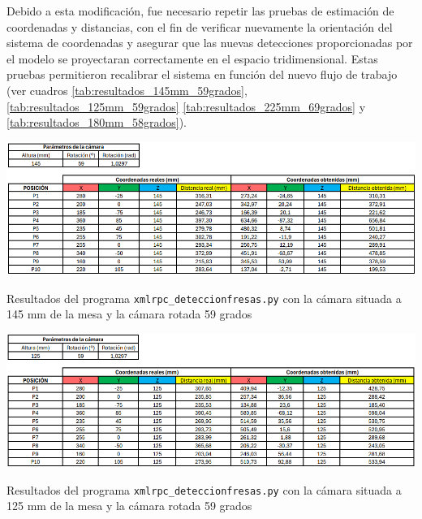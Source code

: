 \pagebreak
Debido a esta modificación, fue necesario repetir las pruebas de estimación de coordenadas y distancias, con el fin de verificar nuevamente la orientación del sistema de coordenadas y asegurar que las nuevas detecciones proporcionadas por el modelo se proyectaran correctamente en el espacio tridimensional. Estas pruebas permitieron recalibrar el sistema en función del nuevo flujo de trabajo (ver cuadros \ref{tab:resultados_145mm_59grados}, \ref{tab:resultados_125mm_59grados} \ref{tab:resultados_225mm_69grados} y \ref{tab:resultados_180mm_58grados}).

   \begin{table}[H]
     \centering
     \begin{center}
       \includegraphics[width=155mm]{figs/Resultados 145 mm 59 grados.png}
     \end{center}
     \caption{Resultados del programa \texttt{xmlrpc\_deteccionfresas.py} con la cámara situada a 145 mm de la mesa y la cámara rotada 59 grados}
     \label{tab:resultados_145mm_59grados}
  \end{table}
  
  \begin{table}[H]
     \centering
     \begin{center}
       \includegraphics[width=155mm]{figs/Resultados 125 mm 59 grados.png}
     \end{center}
     \caption{Resultados del programa \texttt{xmlrpc\_deteccionfresas.py} con la cámara situada a 125 mm de la mesa y la cámara rotada 59 grados}
     \label{tab:resultados_125mm_59grados}
  \end{table}

